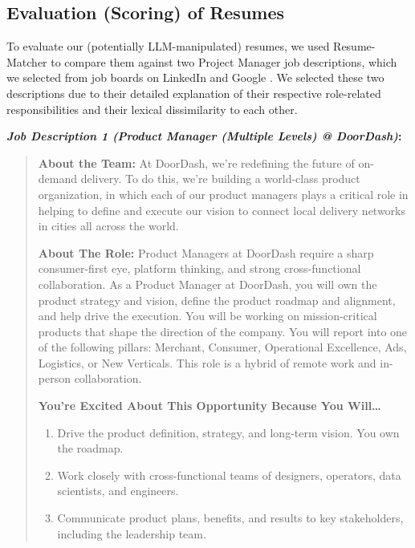     \subsection{Evaluation (Scoring) of Resumes}
    To evaluate our (potentially LLM-manipulated) resumes, we used Resume-Matcher to compare them against two Project Manager job descriptions, which we selected from job boards on LinkedIn \cite{doordash-product-manager} and Google \cite{google-ux}.
 We selected these two descriptions due to their detailed explanation of their respective role-related responsibilities and their lexical dissimilarity to each other.
 
\textbf{\textit{Job Description 1 (Product Manager (Multiple Levels) @ DoorDash)}:}
\begin{quote}
    \textbf{About the Team:} At DoorDash, we're redefining the future of on-demand delivery. To do this, we're building a world-class product organization, in which each of our product managers plays a critical role in helping to define and execute our vision to connect local delivery networks in cities all across the world.

    \textbf{About The Role:} Product Managers at DoorDash require a sharp consumer-first eye, platform thinking, and strong cross-functional collaboration. As a Product Manager at DoorDash, you will own the product strategy and vision, define the product roadmap and alignment, and help drive the execution. You will be working on mission-critical products that shape the direction of the company. You will report into one of the following pillars: Merchant, Consumer, Operational Excellence, Ads, Logistics, or New Verticals. This role is a hybrid of remote work and in-person collaboration.
    
    \textbf{You’re Excited About This Opportunity Because You Will…}
    \begin{enumerate}
        \item Drive the product definition, strategy, and long-term vision. You own the roadmap.
        \item Work closely with cross-functional teams of designers, operators, data scientists, and engineers.
        \item Communicate product plans, benefits, and results to key stakeholders, including the leadership team.
    \end{enumerate}
    

\end{quote}
